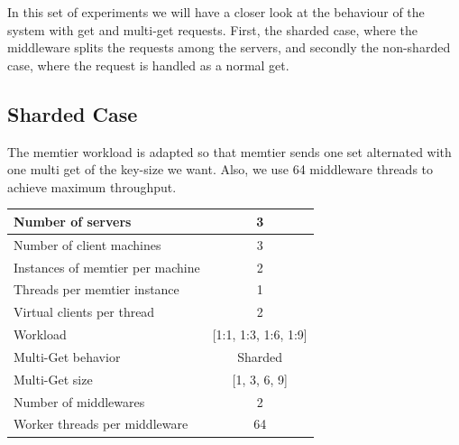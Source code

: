 \documentclass[11pt,a4paper]{article}
\begin{document}
In this set of experiments we will have a closer look at the behaviour of the system with get and multi-get requests. First, the sharded case, where the middleware splits the requests among the servers, and secondly the non-sharded case, where the request is handled as a normal get. 

\subsection{Sharded Case}
The memtier workload is adapted so that memtier sends one set alternated with one multi get of the key-size we want. Also, we use 64 middleware threads to achieve maximum throughput. 

\begin{center}
	\scriptsize{
		\begin{tabular}{|l|c|}
			\hline Number of servers                & 3                       \\ 
			\hline Number of client machines        & 3                       \\ 
			\hline Instances of memtier per machine & 2                       \\ 
			\hline Threads per memtier instance     & 1                       \\
			\hline Virtual clients per thread       & 2     		            \\ 
			\hline Workload                         & [1:1, 1:3, 1:6, 1:9]           \\
			\hline Multi-Get behavior               & Sharded                \\
			\hline Multi-Get size                   & [1, 3, 6, 9]                  \\
			\hline Number of middlewares            & 2                       \\
			\hline Worker threads per middleware    & 64 \\
			\hline 
		\end{tabular}
	} 
\end{center}
\end{document}
